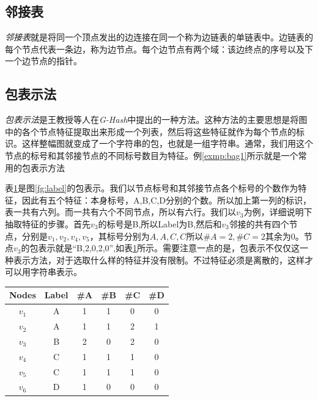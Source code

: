 \documentclass{XDBAthesis}
\begin{document}

\subsection{邻接表}
    \emph{邻接表}就是将同一个顶点发出的边连接在同一个称为边链表的单链表中。边链表的每个节点代表一条边，称为边节点。每个边节点有两个域：该边终点的序号以及下一个边节点的指针。
    
\subsection{包表示法}
\emph{包表示法}是王教授等人在\emph{G-Hash}\cite{ghash}中提出的一种方法。这种方法的主要思想是将图中的各个节点特征提取出来形成一个列表，然后将这些特征就作为每个节点的标识。这样整幅图就变成了一个字符串的包，也就是一组字符串。通常，我们用这个节点的标号和其邻接节点的不同标号数目为特征。例\ref{exmp:bag1}所示就是一个常用的包表示方法
\begin{exmp}
    表\ref{tb:bagr1}是图\ref{fg:label}的包表示。我们以节点标号和其邻接节点各个标号的个数作为特征，因此有五个特征：本身标号，A,B,C,D分别的个数。所以加上第一列的标识，表一共有六列。而一共有六个不同节点，所以有六行。我们以$v_3 $为例，详细说明下抽取特征的步骤。首先$v_3 $的标号是B,所以Label为B,然后和$v_3$邻接的共有四个节点，分别是$v_1 ,v_2 ,v_4 ,v_5 $，其标号分别为$A,A,C,C$所以$\#A=2,\#C=2$其余为0。节点$v_3 $的包表示就是“B,2,0,2,0”,如表\ref{tb:bagr1}所示。需要注意一点的是，包表示不仅仅这一种表示方法，对于选取什么样的特征并没有限制。不过特征必须是离散的，这样才可以用字符串表示。
    \label{exmp:bag1}
\end{exmp}


\begin{table}
    \centering
    \begin{tabular}{c|c|c|c|c|c}
        Nodes & Label & \#A & \#B & \#C & \#D \\ \hline
        $v_1$ & A & 1 & 1 & 0 & 0 \\ \hline
        $v_2$ & A & 1 & 1 & 2 & 1 \\ \hline
        $v_3$ & B & 2 & 0 & 2 & 0 \\ \hline
        $v_4$ & C & 1 & 1 & 1 & 0 \\ \hline
        $v_5$ & C & 1 & 1 & 1 & 0 \\ \hline
        $v_6$ & D & 1 & 0 & 0 & 0 \\ \hline
    \end{tabular}
    \label{tb:bagr1}
\end{table}
    
\end{document}
